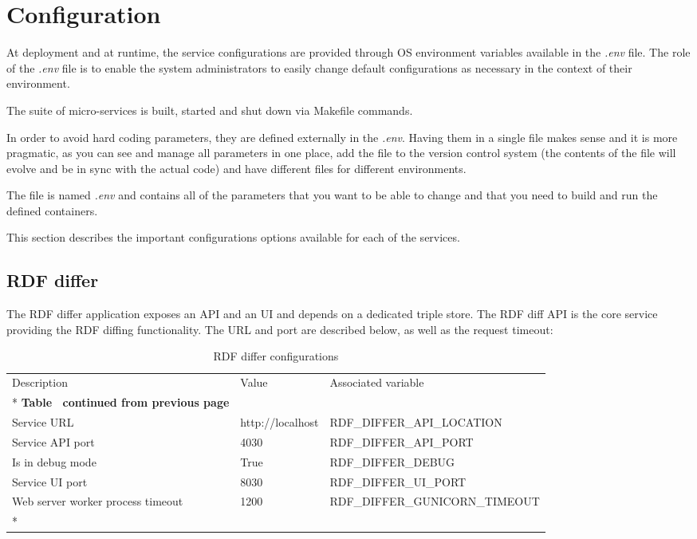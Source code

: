\section{Configuration}
\label{sec:configuration}
At deployment and at runtime, the service configurations are provided through OS environment variables available in the \textit{.env} file. The role of the \textit{.env} file is to enable the system administrators to easily change default configurations as necessary in the context of their environment.

The suite of micro-services is built, started and shut down via Makefile commands.

In order to avoid hard coding parameters, they are defined externally in the \textit{.env}. Having them in a single file makes  sense and it is more pragmatic, as you can see and manage all parameters in one place, add the file to the version control system (the contents of the file will evolve and be in sync with the actual code) and have different files for different environments.

The file is named \textit{.env} and contains all of the parameters that you want to be able to change and that you need to build and run the defined containers. 

This section describes the important configurations options available for each of the services.

\subsection{RDF differ}

The RDF differ application exposes an API and an UI and depends on a dedicated triple store. The RDF diff API is the core service providing the RDF diffing functionality. The URL and port are described below, as well as the request timeout:

\begin{longtable}[c]{@{}p{3.5cm}p{3.5cm}l@{}}
	\toprule
	Description                       & Value            & Associated variable            \\* \midrule
	\endfirsthead
	\multicolumn{3}{c}%
	{{\bfseries Table \thetable\ continued from previous page}}                           \\
	\endhead
	\bottomrule
	\endfoot
	\endlastfoot
	Service URL                       & http://localhost & RDF\_DIFFER\_API\_LOCATION     \\
	Service API port                  & 4030             & RDF\_DIFFER\_API\_PORT         \\
	Is in debug mode                  & True             & RDF\_DIFFER\_DEBUG             \\
	Service UI port                   & 8030             & RDF\_DIFFER\_UI\_PORT          \\
	Web server worker process timeout & 1200             & RDF\_DIFFER\_GUNICORN\_TIMEOUT \\* \bottomrule
	\caption{RDF differ configurations}
	\label{tab:my-table1}                                                                 \\
\end{longtable}


